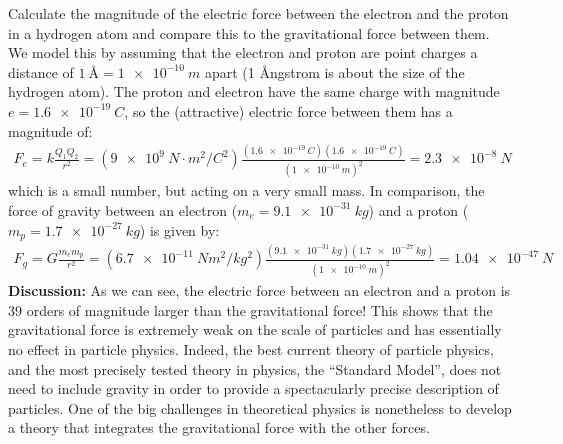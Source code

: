 \begin{example}{Calculate the magnitude of the electric force between the electron and the proton in a hydrogen atom and compare this to the gravitational force between them.}
We model this by assuming that the electron and proton are point charges a distance of $\SI{1}{\angstrom}=\SI{1e-10}{m}$ apart (1 \r Angstrom is about the size of the hydrogen atom). The proton and electron have the same charge with magnitude $e=\SI{1.6e-19}{C}$, so the (attractive) electric force between them has a magnitude of:
\begin{align*}
F_e = k\frac{Q_1Q_2}{r^2}=(\SI{9e9}{N\cdot m^2/C^{2}})\frac{(\SI{1.6e-19}{C})(\SI{1.6e-19}{C})}{(\SI{1e-10}{m})^2}=\SI{2.3e-8}{N}
\end{align*}
which is a small number, but acting on a very small mass. In comparison, the force of gravity between an electron ($m_e=\SI{9.1e-31}{kg}$) and a proton ($m_p=\SI{1.7e-27}{kg}$) is given by:
\begin{align*}
F_g=G\frac{m_em_p}{r^2}=(\SI{6.7e-11}{Nm^2/kg^2})\frac{(\SI{9.1e-31}{kg})(\SI{1.7e-27}{kg})}{(\SI{1e-10}{m})^2}=\SI{1.04e-47}{N}
\end{align*}
\textbf{Discussion:} As we can see, the electric force between an electron and a proton is 39 orders of magnitude larger than the gravitational force! This shows that the gravitational force is extremely weak on the scale of particles and has essentially no effect in particle physics. Indeed, the best current theory of particle physics, and the most precisely tested theory in physics, the ``Standard Model'', does not need to include gravity in order to provide a spectacularly precise description of particles. One of the big challenges in theoretical physics is nonetheless to develop a theory that integrates the gravitational force with the other forces.
\end{example}
\vspace{-0.2cm}
